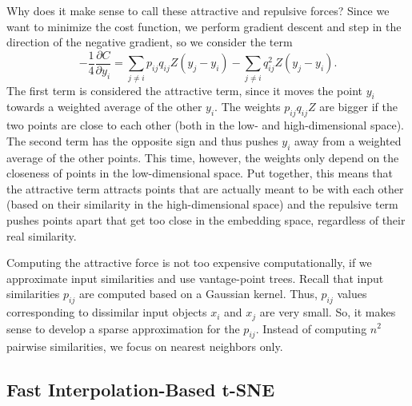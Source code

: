 Why does it make sense to call these attractive and repulsive forces? Since we want to minimize the cost function, we perform gradient descent and step in the direction of the negative gradient, so we consider the term
\begin{equation}
   - \frac{1}{4} \frac{\partial C}{\partial y_i} = \sum_{j \neq i } p_{ij} q_{ij} Z (y_j - y_i) - \sum_{j \neq i} q_{ij}^2 Z (y_j - y_i).  
\end{equation}
The first term is considered the attractive term, since it moves the point $y_i$ towards a weighted average of the other $y_i$. 
The weights $p_{ij} q_{ij} Z$ are bigger if the two points are close to each other (both in the low- and high-dimensional space). 
The second term has the opposite sign and thus pushes $y_i$ away from a weighted average of the other points. This time, however, the weights only depend on the closeness of points in the low-dimensional space. 
Put together, this means that the attractive term attracts points that are actually meant to be with each other (based on their similarity in the high-dimensional space) and the repulsive term pushes points apart that get too close in the embedding space, regardless of their real similarity. 

Computing the attractive force is not too expensive computationally, if we approximate input similarities and use vantage-point trees. Recall that input similarities $p_{ij}$ are computed based on a Gaussian kernel. Thus, $p_{ij}$ values corresponding to dissimilar input objects $x_i$ and $x_j$ are very small. So, it makes sense to develop a sparse approximation for the $p_{ij}$. Instead of computing $n^2$ pairwise similarities, we focus on nearest neighbors only. 


\subsection{Fast Interpolation-Based t-SNE}